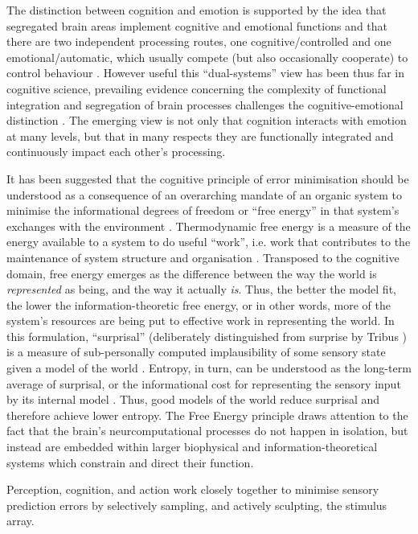 \begin{CJK}{UTF8}{gbsn}
{The distinction between cognition and emotion is supported by the idea that segregated brain areas implement cognitive and emotional functions and that there are two independent processing routes, one cognitive/controlled and one emotional/automatic, which usually compete (but also occasionally cooperate) to control behaviour \citep{Kahneman2003}.  However useful this ``dual-systems'' view has been thus far in cognitive science, prevailing evidence concerning the complexity of functional integration and segregation of brain processes challenges the cognitive-emotional distinction \citep{Pessoa2013}.  The emerging view is not only that cognition interacts with emotion at many levels, but that in many respects they are functionally integrated and continuously impact each other's processing.

It has been suggested that the cognitive principle of error minimisation should be understood as a consequence of an overarching mandate of an organic system to minimise the informational degrees of freedom or ``free energy'' in that system's exchanges with the environment \citep{Friston2010}.  Thermodynamic free energy is a measure of the energy available to a system to do useful ``work'', i.e. work that contributes to the maintenance of system structure and organisation \citep{Stoner2000}.
Transposed to the cognitive domain, free energy emerges as the difference between the way the world is \textit{represented} as being, and the way it actually \textit{is}.
Thus, the better the model fit, the lower the information-theoretic free energy, or in other words, more of the system's resources are being put to effective work in representing the world.  In this formulation, ``surprisal'' (deliberately distinguished from surprise by Tribus \textcite{Tribus1961}) is a measure of sub-personally computed implausibility of some sensory state given a model of the world \citep{Clark2013}.  Entropy, in turn, can be understood as the long-term average of surprisal, or the informational cost for representing the sensory input by its internal model \citep{Little2013}.  Thus, good models of the world reduce surprisal and therefore achieve lower entropy.  The Free Energy principle draws attention to the fact that the brain's neurcomputational processes do not happen in isolation, but instead are embedded within larger biophysical and information-theoretical systems which constrain and direct their function.


Perception, cognition, and action work closely together to minimise sensory prediction errors by selectively sampling, and actively sculpting, the stimulus array.












}
\end{CJK}
